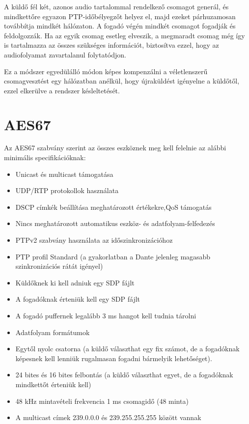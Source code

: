 A küldő fél két, azonos audio tartalommal rendelkező csomagot generál, és mindkettőre 
egyazon PTP-időbélyegzőt helyez el, majd ezeket párhuzamosan továbbítja mindkét hálózaton. 
A fogadó végén mindkét csomagot fogadják és feldolgozzák. Ha az egyik csomag 
esetleg elveszik, a megmaradt csomag még így is tartalmazza az összes szükséges információt, 
biztosítva ezzel, hogy az audiofolyamat zavartalanul folytatódjon.

Ez a módszer egyedülálló módon képes kompenzálni a véletlenszerű csomagvesztést 
egy hálózatban anélkül, hogy újraküldést igényelne a küldőtől, ezzel elkerülve a rendszer késleltetését.
\section{AES67}
Az AES67 szabvány szerint az összes eszköznek meg kell felelnie az
alábbi minimális specifikációknak: 

\begin{itemize}
	\item Unicast és multicast támogatása
	\item UDP/RTP protokollok használata
	\item DSCP címkék beállítása meghatározott értékekre,QoS támogatás 
	\item Nincs meghatározott automatikus eszköz- és adatfolyam-felfedezés 
	\item PTPv2 szabvány használata az időszinkronizációhoz
	\item PTP profil Standard (a gyakorlatban a Dante jelenleg magasabb szinkronizációs rátát igényel)
	\item Küldőknek ki kell adniuk egy SDP fájlt
	\item A fogadóknak érteniük kell egy SDP fájlt
	\item A fogadó puffernek legalább 3 ms hangot kell tudnia tárolni
	\item Adatfolyam formátumok
	\item Egytől nyolc csatorna (a küldő választhat egy fix számot, de a fogadóknak képesnek kell lenniük rugalmasan fogadni bármelyik lehetőséget).
	\item 24 bites és 16 bites felbontás (a küldő választhat egyet, de a fogadóknak mindkettőt érteniük kell) 
	\item 48 kHz mintavételi frekvencia 1 ms csomagidő (48 minta)
	\item A multicast címek 239.0.0.0 és 239.255.255.255 között vannak 
\end{itemize}

